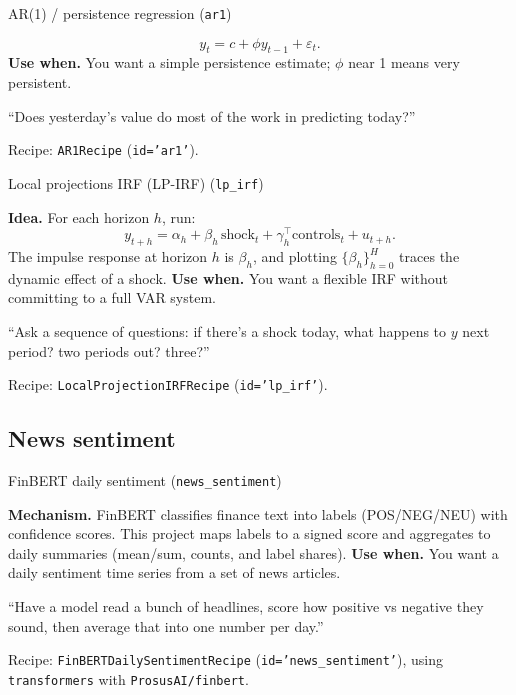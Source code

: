 \documentclass[11pt]{article}
\begin{document}
\begin{ConceptBox}{AR(1) / persistence regression (\texttt{ar1})}
\begin{ClassroomBox}
\[
y_t = c + \phi y_{t-1} + \varepsilon_t.
\]
\textbf{Use when.} You want a simple persistence estimate; \(\phi\) near 1 means very persistent.
\end{ClassroomBox}
\begin{IntuitionBox}
“Does yesterday’s value do most of the work in predicting today?”
\end{IntuitionBox}
\begin{WhereBox}
Recipe: \texttt{AR1Recipe} (\texttt{id='ar1'}).
\end{WhereBox}
\end{ConceptBox}

\begin{ConceptBox}{Local projections IRF (LP-IRF) (\texttt{lp\_irf})}
\begin{ClassroomBox}
\textbf{Idea.} For each horizon \(h\), run:
\[
y_{t+h} = \alpha_h + \beta_h \,\text{shock}_t + \gamma_h^\top \text{controls}_t + u_{t+h}.
\]
The impulse response at horizon \(h\) is \(\beta_h\), and plotting \(\{\beta_h\}_{h=0}^H\) traces the dynamic effect of a shock.
\textbf{Use when.} You want a flexible IRF without committing to a full VAR system.
\end{ClassroomBox}
\begin{IntuitionBox}
“Ask a sequence of questions: if there’s a shock today, what happens to \(y\) next period? two periods out? three?”
\end{IntuitionBox}
\begin{WhereBox}
Recipe: \texttt{LocalProjectionIRFRecipe} (\texttt{id='lp\_irf'}).
\end{WhereBox}
\end{ConceptBox}

\subsection{News sentiment}

\begin{ConceptBox}{FinBERT daily sentiment (\texttt{news\_sentiment})}
\begin{ClassroomBox}
\textbf{Mechanism.} FinBERT classifies finance text into labels (POS/NEG/NEU) with confidence scores. This project maps labels to a signed score and aggregates to daily summaries (mean/sum, counts, and label shares).
\textbf{Use when.} You want a daily sentiment time series from a set of news articles.
\end{ClassroomBox}
\begin{IntuitionBox}
“Have a model read a bunch of headlines, score how positive vs negative they sound, then average that into one number per day.”
\end{IntuitionBox}
\begin{WhereBox}
Recipe: \texttt{FinBERTDailySentimentRecipe} (\texttt{id='news\_sentiment'}), using \texttt{transformers} with \texttt{ProsusAI/finbert}.
\end{WhereBox}
\end{ConceptBox}
\end{document}
